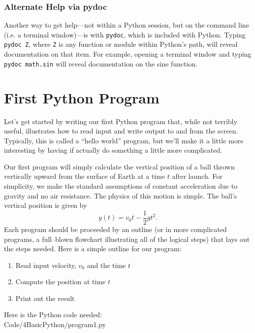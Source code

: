 \subsubsection{Alternate Help via pydoc}
\label{sec:pydoc}
Another way to get help---not within a Python session, but on the command line (i.e. a terminal window)---is with \verb!pydoc!, which is included with Python. Typing \verb!pydoc Z!, where \verb!Z! is any function or module within Python's path, will reveal documentation on that item. For example, opening a terminal window and typing \verb!pydoc math.sin!
will reveal documentation on the sine function. 



\section{First Python Program}
\label{sec:FirstProgram}

Let's get started by writing our first Python program that, while not terribly useful, illustrates how to read input and write output to and from the screen. Typically, this is called a ``hello world'' program, but we'll make it a little more interesting by having if actually do something a little more complicated. 

Our first program will simply calculate the vertical position of a ball thrown vertically upward from the surface of Earth at a time $t$ after launch. For simplicity, we make the standard assumptions of constant acceleration due to gravity and no air resistance.
The physics of this motion is simple. The ball's vertical position is given by 
	\begin{equation}
		y(t) = v_0 t - \frac{1}{2}gt^2 .
	\end{equation}
Each program should be proceeded by an outline (or in more complicated programs, a full--blown flowchart illustrating all of the logical steps) that lays out the steps needed. Here is a simple outline for our program:
\begin{enumerate}
	\item Read input velocity, $v_0$ and the time $t$
	\item Compute the position at time $t$
	\item Print out the result
\end{enumerate}
 Here is the Python code needed: \\

{Code/4BasicPython/program1.py}

